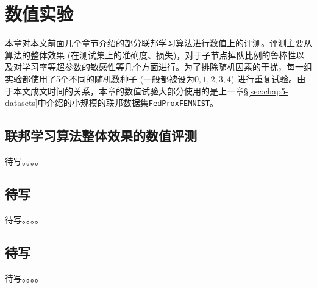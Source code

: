 \chapter{\hspace{-1mm}\bf 数值实验}
\label{chap6}


本章对本文前面几个章节介绍的部分联邦学习算法进行数值上的评测。评测主要从算法的整体效果 (在测试集上的准确度、损失)，对于子节点掉队比例的鲁棒性以及对学习率等超参数的敏感性等几个方面进行。为了排除随机因素的干扰，每一组实验都使用了5个不同的随机数种子 (一般都被设为$0, 1, 2, 3, 4$) 进行重复试验。由于本文成文时间的关系，本章的数值试验大部分使用的是上一章\S\ref{sec:chap5-datasets}中介绍的小规模的联邦数据集\texttt{FedProxFEMNIST}。


\section{联邦学习算法整体效果的数值评测}
\label{sec:chap6-overall}


待写。。。。

\section{待写}


待写。。。。

\section{待写}


待写。。。。
